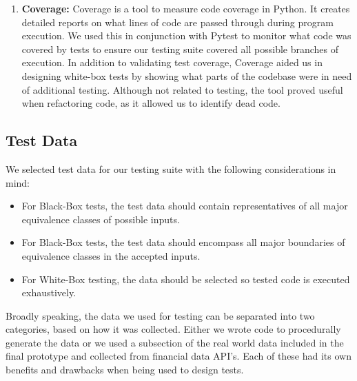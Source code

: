 \documentclass[main.tex]{subfiles}
\begin{document}
\begin{enumerate}
\item \textbf{Coverage:\cite{coverage}}
Coverage is a tool to measure code coverage in Python. It creates detailed reports on what lines of code are passed through during program execution. We used this in conjunction with Pytest to monitor what code was covered by tests to ensure our testing suite covered all possible branches of execution. In addition to validating test coverage, Coverage aided us in designing white-box tests by showing what parts of the codebase were in need of additional testing. Although not related to testing, the tool proved useful when refactoring code, as it allowed us to identify dead code.

\end{enumerate}


\subsection{Test Data}

We selected test data for our testing suite with the following considerations in mind:

\begin{itemize}

\item For Black-Box tests, the test data should contain representatives of all major equivalence classes of possible inputs.
\item For Black-Box tests, the test data should encompass all major boundaries of equivalence classes in the accepted inputs.
\item For White-Box testing, the data should be selected so tested code is executed exhaustively.

\end{itemize}

Broadly speaking, the data we used for testing can be separated into two categories, based on how it was collected. Either we wrote code to procedurally generate the data or we used a subsection of the real world data included in the final prototype and collected from financial data API’s. Each of these had its own benefits and drawbacks when being used to design tests.
\end{document}
